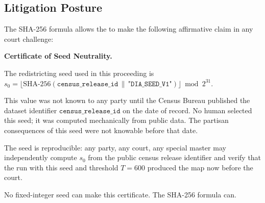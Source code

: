 \subsection{Litigation Posture}

The SHA-256 formula allows the \dia{} to make the following affirmative claim
in any court challenge:

\begin{statute}
\textbf{Certificate of Seed Neutrality.}

The redistricting seed used in this proceeding is
$s_0 = \lfloor \mathrm{SHA\text{-}256}(\texttt{census\_release\_id} \,\|\,
\texttt{"DIA\_SEED\_V1"}) \rfloor \bmod 2^{31}$.

\medskip

This value was not known to any party until the Census Bureau published the
dataset identifier $\mathtt{census\_release\_id}$ on the date of record.
No human selected this seed; it was computed mechanically from public data.
The partisan consequences of this seed were not knowable before that date.

\medskip

The seed is reproducible: any party, any court, any special master may
independently compute $s_0$ from the public census release identifier and
verify that the \cs{} run with this seed and threshold $T = 600$ produced the
map now before the court.
\end{statute}

No fixed-integer seed can make this certificate.
The SHA-256 formula can.
